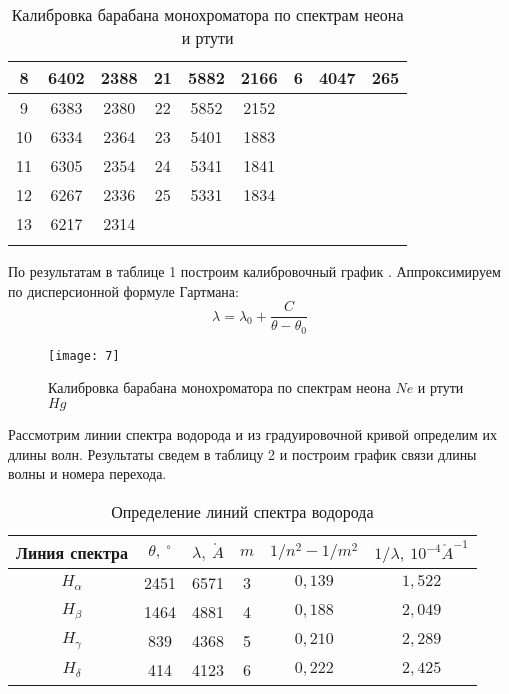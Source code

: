 \documentclass[a4paper, 12pt]{article}
\begin{document}
\begin{longtable}{|c|c|c|cccccc}
8  & 6402 & 2388 & \multicolumn{1}{c|}{21} & \multicolumn{1}{c|}{5882} & \multicolumn{1}{c|}{2166} & \multicolumn{1}{c|}{6}  & \multicolumn{1}{c|}{4047} & \multicolumn{1}{c|}{265}  \\ \hline
9  & 6383 & 2380 & \multicolumn{1}{c|}{22} & \multicolumn{1}{c|}{5852} & \multicolumn{1}{c|}{2152} & \multicolumn{3}{c}{\multirow{4}{*}{}}                                           \\ \cline{1-6}
10 & 6334 & 2364 & \multicolumn{1}{c|}{23} & \multicolumn{1}{c|}{5401} & \multicolumn{1}{c|}{1883} & \multicolumn{3}{c}{}                                                            \\ \cline{1-6}
11 & 6305 & 2354 & \multicolumn{1}{c|}{24} & \multicolumn{1}{c|}{5341} & \multicolumn{1}{c|}{1841} & \multicolumn{3}{c}{}                                                            \\ \cline{1-6}
12 & 6267 & 2336 & \multicolumn{1}{c|}{25} & \multicolumn{1}{c|}{5331} & \multicolumn{1}{c|}{1834} & \multicolumn{3}{c}{}                                                            \\ \cline{1-6}
13 & 6217 & 2314 & \multicolumn{6}{c}{}  \\
\cline{1-3}                                     
\caption{Калибровка барабана монохроматора по спектрам неона и ртути}
\end{longtable}

По результатам в таблице 1 построим калибровочный график .
Аппроксимируем по дисперсионной формуле Гартмана:
\[
    \lambda = \lambda_0 + \frac{C}{\theta - \theta_0}
\]
\begin{figure}[H]
    \texttt{[image: 7]} 
    \caption{Калибровка барабана монохроматора по спектрам неона $N\!
    e$ и ртути $H\! g$}
    \label{fig:7}
\end{figure}

Рассмотрим линии спектра водорода и из градуировочной кривой определим
их длины волн. Результаты сведем в таблицу 2 и построим график связи
длины волны и номера перехода. 


\begin{table}[H]
\centering
\begin{tabular}{|c|c|c|c|c|c|}
\hline
Линия спектра & $\theta, \: ^{\circ}$  & $\lambda,\: \mathring{A}$  &
$m$ & $1/n^2-1/m^2$  & $1/\lambda,\: 10^{-4} \mathring{A}^{-1}$ \\ \hline
$H_\alpha$ & 2451 & 6571 & 3 & $0,139$ & $1,522$ \\ \hline
$H_\beta$ & 1464 & 4881 & 4 & $0,188$ & $2,049$ \\ \hline
$H_\gamma$ & 839 & 4368  & 5 & $0,210$ & $2,289$ \\ \hline
$H_\delta$ & 414 & 4123  & 6 & $0,222$ & $2,425$ \\ \hline
\end{tabular}
\caption{Определение линий спектра водорода}
\end{table}
\end{document}
